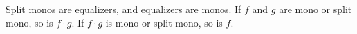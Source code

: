 Split monos are equalizers, and equalizers are monos. If $f$ and $g$ are mono or split mono, so is $f \cdot g$. If $f \cdot g$ is mono or split mono, so is $f$.
